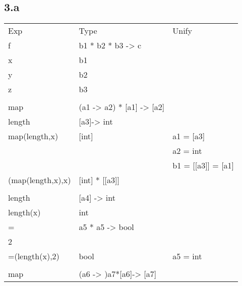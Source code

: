\documentclass[11pt,a4paper]{article}
\begin{document}
\subsection{3.a}
\begin{tabular}{l l l}
    Exp                 & Type                                          & Unify\\
    f                   & b1 * b2 * b3 -> c                             & \\
    x                   & b1                                            & \\
    y                   & b2                                            & \\
    z                   & b3                                            & \\ 
                        &                                               & \\ \hline
    map                 & (a1 -> a2) * [a1] -> [a2]                     & \\
    length              & [a3]-> int                                    & \\
    map(length,x)       & [int]                                         & a1 = [a3] \\
                        &                                               & a2 = int \\
                        &                                               & b1 = [[a3]] = [a1] \\
    (map(length,x),x)   & [int] * [[a3]]                                & \\
                        &                                               & \\ \hline
    length              & [a4] -> int                                   & \\
    length(x)           & int                                           & \\
    =                   & a5 * a5 -> bool                               & \\
    2                   &                                               & \\ 
    =(length(x),2)      & bool                                          & a5 = int \\ 
                        &                                               & \\ \hline
    map                 & (a6 -> )a7*[a6]-> [a7]                        & \\

\end{tabular}
\end{document}
